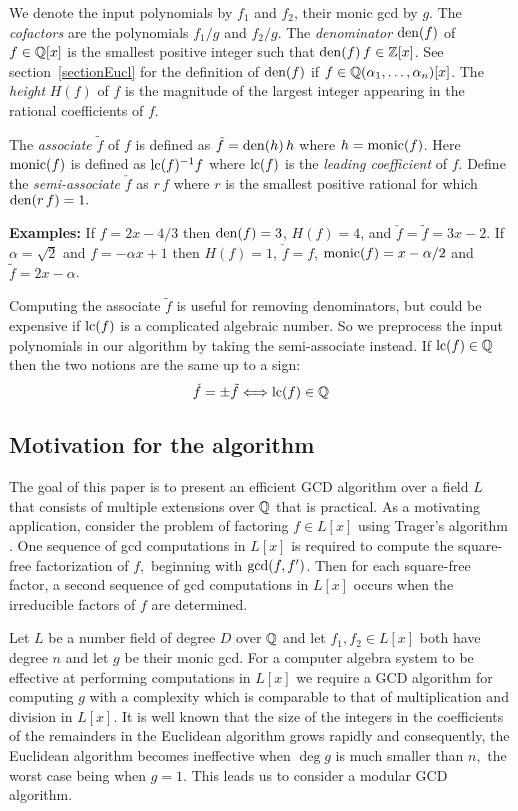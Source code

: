 \documentclass[10pt]{article}
\begin{document}
We denote the input polynomials by $f_1$ and $f_2$, their monic gcd by $g$.
The {\em cofactors} are the polynomials $f_1/g$ and $f_2/g$.
The {\em denominator} ${\rm den}(f)$ of $f \in {\mathbb Q}[x]$ is the
smallest positive integer such that ${\rm den}(f) \, f \in {\mathbb Z}[x]$.
See section~\ref{sectionEucl} for the definition of ${\rm den}(f)$
if $f \in {\mathbb Q}(\alpha_1,\ldots,\alpha_n)[x]$.
The {\em height} $H(f)$ of $f$ is the magnitude of the largest
integer appearing in the rational coefficients of $f$.

The {\em associate} $\tilde f$ of $f$ is defined as
$\tilde{f} = {\rm den}(h)\,h$ where $h = {\rm monic}(f)$.
Here ${\rm monic}(f)$ is defined as ${\rm lc}(f)^{-1} f$ where ${\rm lc}(f)$ is
the {\em leading coefficient} of $f$.
Define the {\em semi-associate} $\check{f}$ as $r \, f$ where
$r$ is the smallest positive rational for which ${\rm den}(r \, f)=1.$

\bigskip
\noindent
{\bf Examples:} If $f = 2 x - 4/3$ then
${\rm den}(f) = 3$, $H(f) = 4$, and $\check{f} = \tilde f = 3x - 2.$
If $\alpha= \sqrt 2$ and $f = - \alpha x + 1$ then $H(f) = 1$, $\check{f} = f$,
${\rm monic}(f) = x - \alpha/2$ and $\tilde f = 2 x - \alpha$.


\bigskip
\noindent
Computing the associate $\tilde{f}$ is useful for removing denominators,
but could be expensive if ${\rm lc}(f)$ is a complicated algebraic number.
So we preprocess the input polynomials in our algorithm
by taking the semi-associate instead.
If ${\rm lc}(f) \in {\mathbb Q}$ then the two notions are the same up to a sign:
\[ \check{f} = \pm \tilde{f} \Longleftrightarrow {\rm lc}(f) \in {\mathbb Q} \]




\subsection{Motivation for the algorithm}
\label{advantages}
The goal of this paper is to present an efficient
GCD algorithm over a field $L$ that consists of
multiple extensions over ${\mathbb Q}$ that is practical.
As a motivating application, consider the problem of factoring $f \in L[x]$
using Trager's algorithm \cite{Trager}.
One sequence of gcd computations in $L[x]$ is required to compute the
square-free factorization of $f,$ beginning with ${\rm gcd}(f,f')$.
Then for each square-free factor, a second sequence of gcd computations
in $L[x]$ occurs when the irreducible factors of $f$ are determined.

Let $L$ be a number field of degree $D$ over ${\mathbb Q}$ and
let $f_1, f_2 \in L[x]$ both have degree $n$ and let $g$ be their monic gcd.
For a computer algebra system to be effective at performing computations
in $L[x]$ we require a GCD algorithm for computing $g$ with a complexity
which is comparable to that of multiplication and division in $L[x].$
It is well known that the size of the integers in the
coefficients of the remainders in the Euclidean algorithm grows
rapidly and consequently, the Euclidean algorithm becomes ineffective
when $\deg g$ is much smaller than $n,$ the worst case being when $g = 1$.
This leads us to consider a modular GCD algorithm.
\end{document}
